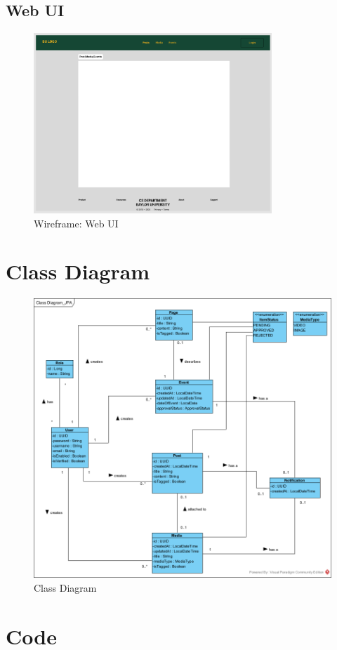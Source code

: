 \documentclass{article}
\begin{document}
\subsection{Web UI}
\begin{figure}[H]
    \centering
    \includegraphics[width=0.8\textwidth]{images/wireframe_webUI.png}
    \centering
    \caption{Wireframe: Web UI}
\end{figure}
\section{Class Diagram}
\begin{figure}[H]
    \centering
    \includegraphics[width=.98\textwidth]{images/ClassDiagram.png}
    \centering
    \caption{Class Diagram}
\end{figure}%
\section{Code}

\end{document}
